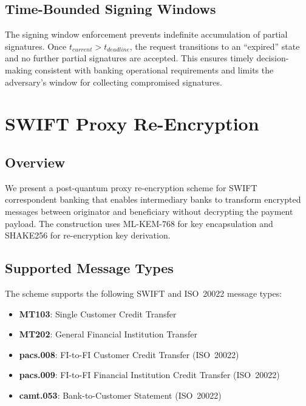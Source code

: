 \documentclass[conference,10pt]{IEEEtran}
\begin{document}
\subsection{Time-Bounded Signing Windows}

The signing window enforcement prevents indefinite accumulation of partial signatures. Once $t_{current} > t_{deadline}$, the request transitions to an ``expired'' state and no further partial signatures are accepted. This ensures timely decision-making consistent with banking operational requirements and limits the adversary's window for collecting compromised signatures.

\section{SWIFT Proxy Re-Encryption}

\subsection{Overview}

We present a post-quantum proxy re-encryption scheme for SWIFT correspondent banking that enables intermediary banks to transform encrypted messages between originator and beneficiary without decrypting the payment payload. The construction uses ML-KEM-768 for key encapsulation and SHAKE256 for re-encryption key derivation.

\subsection{Supported Message Types}

The scheme supports the following SWIFT and ISO~20022 message types:
\begin{itemize}[leftmargin=*]
\item \textbf{MT103}: Single Customer Credit Transfer
\item \textbf{MT202}: General Financial Institution Transfer
\item \textbf{pacs.008}: FI-to-FI Customer Credit Transfer (ISO~20022)
\item \textbf{pacs.009}: FI-to-FI Financial Institution Credit Transfer (ISO~20022)
\item \textbf{camt.053}: Bank-to-Customer Statement (ISO~20022)
\end{itemize}
\end{document}
